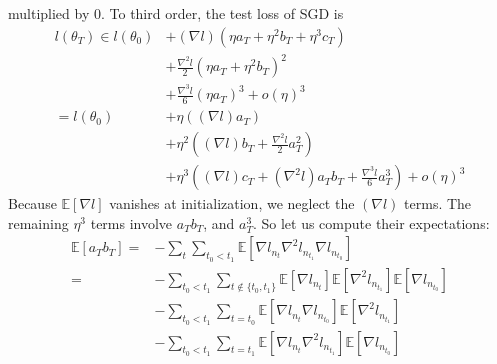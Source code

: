 \documentclass[openany, notitlepage, justified]{tufte-book}
\theoremstyle{plain}
\theoremstyle{definition}
\newcommand{\wrap}[1]{\left(#1\right)}
\newcommand{\expct}[1]{\mathbb{E}\left[#1\right]}
\begin{document}
\begin{shaded}
                multiplied by $0$.
                To third order, the test loss of SGD is
                \begin{align*}
                    l(\theta_T)
                    \in
                            l(\theta_0)
                    &+     (\nabla   l)   (\eta a_T + \eta^2 b_T + \eta^3 c_T)                              \\
                    &+\frac{\nabla^2 l}{2}(\eta a_T + \eta^2 b_T             )^2                            \\
                    &+\frac{\nabla^3 l}{6}(\eta a_T                          )^3 
                     +o(\eta)^3                                                                             \\
                    =
                        l(\theta_0)
                    &+  \eta       \wrap{(\nabla l) a_T                               }                     \\
                    &+  \eta^2     \wrap{(\nabla l) b_T + \frac{\nabla^2 l}{2} a_T^2  }                     \\
                    &+  \eta^3     \wrap{(\nabla l) c_T + (\nabla^2 l) a_T b_T + \frac{\nabla^3 l}{6} a_T^3}
                     +o(\eta)^3                                                                             
                \end{align*}
                Because $\expct{\nabla l}$ vanishes at initialization, we neglect
                the $(\nabla l)$ terms.  The remaining $\eta^3$ terms involve
                $a_T b_T$, and $a_T^3$.  So let us
                compute their expectations:
                \begin{align*}
                    \expct{a_T b_T}
                        =&- \sum_{t} \sum_{t_0 < t_1}
                            \expct{\nabla l_{n_t} \nabla^2 l_{n_{t_1}} \nabla l_{n_{t_0}}}
                        \\
                        =&- \sum_{t_0 < t_1}  
                            \sum_{t \notin \{t_0, t_1\}} 
                                \expct{\nabla l_{n_t}} \expct{\nabla^2 l_{n_{t_1}}} \expct{\nabla l_{n_{t_0}}}
                        \\&- \sum_{t_0 < t_1}  
                            \sum_{t = t_0}
                                \expct{\nabla l_{n_t} \nabla l_{n_{t_0}}} \expct{\nabla^2 l_{n_{t_1}}}
                        \\&- \sum_{t_0 < t_1}  
                            \sum_{t = t_1}
                                \expct{\nabla l_{n_t} \nabla^2 l_{n_{t_1}}} \expct{\nabla l_{n_{t_0}}}
                \end{align*}
            \end{shaded}
\end{document}
